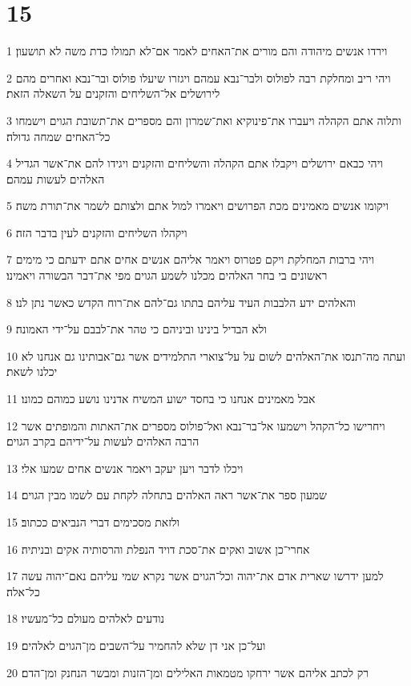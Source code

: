 \chapter{15}

\par 1 וירדו אנשים מיהודה והם מורים את־האחים לאמר אם־לא תמולו כדת משה לא תושעון׃
\par 2 ויהי ריב ומחלקת רבה לפולוס ולבר־נבא עמהם ויגזרו שיעלו פולוס ובר־נבא ואחרים מהם לירושלים אל־השליחים והזקנים על השאלה הזאת׃
\par 3 ותלוה אתם הקהלה ויעברו את־פינוקיא ואת־שמרון והם מספרים את־תשובת הגוים וישמחו כל־האחים שמחה גדולה׃
\par 4 ויהי כבאם ירושלים ויקבלו אתם הקהלה והשליחים והזקנים ויגידו להם את־אשר הגדיל האלהים לעשות עמהם׃
\par 5 ויקומו אנשים מאמינים מכת הפרושים ויאמרו למול אתם ולצותם לשמר את־תורת משה׃
\par 6 ויקהלו השליחים והזקנים לעין בדבר הזה׃
\par 7 ויהי ברבות המחלקת ויקם פטרוס ויאמר אליהם אנשים אחים אתם ידעתם כי מימים ראשונים בי בחר האלהים מכלנו לשמע הגוים מפי את־דבר הבשורה ויאמינו׃
\par 8 והאלהים ידע הלבבות העיד עליהם בתתו גם־להם את־רוח הקדש כאשר נתן לנו׃
\par 9 ולא הבדיל בינינו וביניהם כי טהר את־לבבם על־ידי האמונה׃
\par 10 ועתה מה־תנסו את־האלהים לשום על על־צוארי התלמידים אשר גם־אבותינו גם אנחנו לא יכלנו לשאת׃
\par 11 אבל מאמינים אנחנו כי בחסד ישוע המשיח אדנינו נושע כמוהם כמונו׃
\par 12 ויחרישו כל־הקהל וישמעו אל־בר־נבא ואל־פולוס מספרים את־האתות והמופתים אשר הרבה האלהים לעשות על־ידיהם בקרב הגוים׃
\par 13 ויכלו לדבר ויען יעקב ויאמר אנשים אחים שמעו אלי׃
\par 14 שמעון ספר את־אשר ראה האלהים בתחלה לקחת עם לשמו מבין הגוים׃
\par 15 ולזאת מסכימים דברי הנביאים ככתוב׃
\par 16 אחרי־כן אשוב ואקים את־סכת דויד הנפלת והרסותיה אקים ובניתיה׃
\par 17 למען ידרשו שארית אדם את־יהוה וכל־הגוים אשר נקרא שמי עליהם נאם־יהוה עשה כל־אלה׃
\par 18 נודעים לאלהים מעולם כל־מעשיו׃
\par 19 ועל־כן אני דן שלא להחמיר על־השבים מן־הגוים לאלהים׃
\par 20 רק לכתב אליהם אשר ירחקו מטמאות האלילים ומן־הזנות ומבשר הנחנק ומן־הדם׃
